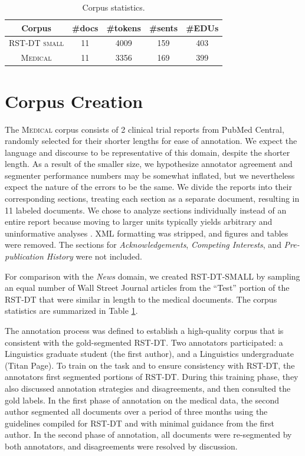 \begin{table}[t]
\centering
\small
\begin{tabular}{ccccc}
\toprule
Corpus & \#docs  & \#tokens     & \#sents     & \#EDUs    \\ 
\midrule
\textsc{RST-DT small} &11  &4009  &159  &403  \\
                                  \textsc{Medical} & 11 &3356  &169  &399\\             \bottomrule
\end{tabular}
\vspace{-0.6em}
\caption{Corpus statistics.}
\label{tab:cross_domain_corpus}
\end{table}

\section{Corpus Creation}

 The \textsc{Medical} corpus consists of 2 clinical trial reports from PubMed Central, randomly selected for their shorter lengths for ease of annotation. We expect the language and discourse to be representative of this domain, despite the shorter length. As a result of the smaller size, we hypothesize annotator agreement and segmenter performance numbers may be somewhat inflated, but we nevertheless expect the nature of the errors to be the same. We divide the reports into their corresponding sections, treating each section as a separate document, resulting in 11 labeled documents. We chose to analyze sections individually instead of an entire report because moving to larger units typically yields arbitrary and uninformative analyses \cite{Taboada:2006}. XML formatting was stripped, and figures and tables were removed. The sections for \textit{Acknowledgements}, \textit{Competing Interests}, and \textit{Pre-publication History} were not included. 
 
 For comparison with the \textit{News} domain, we created \textsc{RST-DT-SMALL} by sampling an equal number of Wall Street Journal articles from the ``Test'' portion of the RST-DT that were similar in length to the medical documents. The corpus statistics are summarized in Table \ref{tab:cross_domain_corpus}.

\medskip
{} The annotation process was defined to establish a high-quality corpus that is consistent with the gold-segmented RST-DT. Two annotators participated: a Linguistics graduate student (the first author), and a Linguistics undergraduate (Titan Page). To train on the task and to ensure consistency with RST-DT, the annotators first segmented portions of RST-DT. During this training phase, they also discussed annotation strategies and disagreements, and then consulted the gold labels. In the first phase of annotation on the medical data, the second author segmented all documents over a period of three months using the guidelines compiled for RST-DT \cite{Carlson:2001b} and with minimal guidance from the first author. In the second phase of annotation, all documents were re-segmented by both annotators, and disagreements were resolved by discussion.

